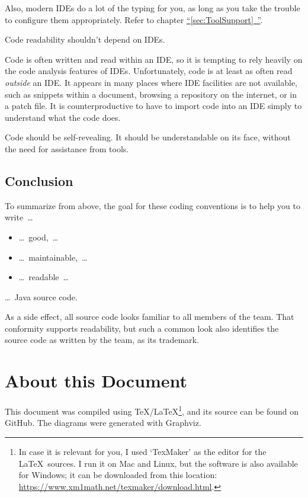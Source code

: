 \documentclass[11pt,a4paper, titlepage, parskip=half, headsepline, footsepline, cleardoublepage=current, headheight=1cm]{scrbook}
\newcommand*{\tqfullref}[1]{\hyperref[{#1}]{“\ref*{#1}~\nameref*{#1}”}}
\begin{document}
Also, modern IDEs do a lot of the typing for you, as long as you take the trouble to configure them appropriately. Refer to chapter \tqfullref{sec:ToolSupport}.

Code readability shouldn’t depend on IDEs.\autocite{Marks:LocalVariableTypeInference:NoIDEDependency}

Code is often written and read within an IDE, so it is tempting to rely heavily on the code analysis features of IDEs. Unfortunately, code is at least as often read \textit{outside} an IDE. It appears in many places where IDE facilities are not available, such as snippets within a document, browsing a repository on the internet, or in a patch file. It is counterproductive to have to import code into an IDE simply to understand what the code does.

Code should be self-revealing. It should be understandable on its face, without the need for assistance from tools.

\subsection{Conclusion}
To summarize from above, the goal for these coding conventions is to help you to write~…
\begin{itemize}[nosep]
	\item …~good,~…
	\item …~maintainable,~…
	\item …~readable~…
\end{itemize}
…~Java source code.

As a side effect, all source code looks familiar to all members of the team. That conformity supports readability, but such a common look also identifies the source code as written by the team, as its trademark.

\section{About this Document}
This document was compiled using \TeX/\LaTeX{}\footnote{In case it is relevant for you, I used ‘TexMaker’ as the editor for the \LaTeX~sources. I run it on Mac and Linux, but the software is also available for Windows; it can be downloaded from this location: \url{https://www.xm1math.net/texmaker/download.html}.}, and its source can be found on GitHub\autocite{TQUADRAT_ORG_DOCUMENT_REPOSITORY}. The diagrams were generated with Graphviz.
\end{document}
